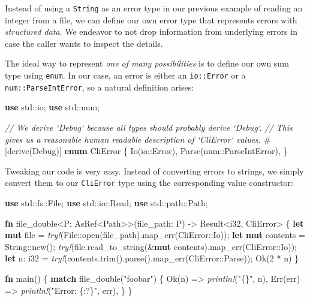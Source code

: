 \documentclass[a4paper,]{book}
\newenvironment{Shaded}{\begin{snugshade}}{\end{snugshade}}
\newcommand{\KeywordTok}[1]{\textcolor[rgb]{0.13,0.29,0.53}{\textbf{{#1}}}}
\newcommand{\DataTypeTok}[1]{\textcolor[rgb]{0.13,0.29,0.53}{{#1}}}
\newcommand{\DecValTok}[1]{\textcolor[rgb]{0.00,0.00,0.81}{{#1}}}
\newcommand{\ConstantTok}[1]{\textcolor[rgb]{0.00,0.00,0.00}{{#1}}}
\newcommand{\StringTok}[1]{\textcolor[rgb]{0.31,0.60,0.02}{{#1}}}
\newcommand{\CommentTok}[1]{\textcolor[rgb]{0.56,0.35,0.01}{\textit{{#1}}}}
\newcommand{\BuiltInTok}[1]{{#1}}
\newcommand{\PreprocessorTok}[1]{\textcolor[rgb]{0.56,0.35,0.01}{\textit{{#1}}}}
\newcommand{\AttributeTok}[1]{\textcolor[rgb]{0.77,0.63,0.00}{{#1}}}
\newcommand{\NormalTok}[1]{{#1}}
\begin{document}
Instead of using a \texttt{String} as an error type in our previous
example of reading an integer from a file, we can define our own error
type that represents errors with \emph{structured data}. We endeavor to
not drop information from underlying errors in case the caller wants to
inspect the details.

The ideal way to represent \emph{one of many possibilities} is to define
our own sum type using \texttt{enum}. In our case, an error is either an
\texttt{io::Error} or a \texttt{num::ParseIntError}, so a natural
definition arises:

\begin{Shaded}
\begin{Highlighting}[]
\KeywordTok{use} \NormalTok{std::io;}
\KeywordTok{use} \NormalTok{std::num;}

\CommentTok{// We derive `Debug` because all types should probably derive `Debug`.}
\CommentTok{// This gives us a reasonable human readable description of `CliError` values.}
\AttributeTok{#[}\NormalTok{derive}\AttributeTok{(}\BuiltInTok{Debug}\AttributeTok{)]}
\KeywordTok{enum} \NormalTok{CliError \{}
    \NormalTok{Io(io::Error),}
    \NormalTok{Parse(num::ParseIntError),}
\NormalTok{\}}
\end{Highlighting}
\end{Shaded}

Tweaking our code is very easy. Instead of converting errors to strings,
we simply convert them to our \texttt{CliError} type using the
corresponding value constructor:

\begin{Shaded}
\begin{Highlighting}[]
\KeywordTok{use} \NormalTok{std::fs::File;}
\KeywordTok{use} \NormalTok{std::io::Read;}
\KeywordTok{use} \NormalTok{std::path::Path;}

\KeywordTok{fn} \NormalTok{file_double<P: AsRef<Path>>(file_path: P) -> }\DataTypeTok{Result}\NormalTok{<}\DataTypeTok{i32}\NormalTok{, CliError> \{}
    \KeywordTok{let} \KeywordTok{mut} \NormalTok{file = }\PreprocessorTok{try!}\NormalTok{(File::open(file_path).map_err(CliError::Io));}
    \KeywordTok{let} \KeywordTok{mut} \NormalTok{contents = }\DataTypeTok{String}\NormalTok{::new();}
    \PreprocessorTok{try!}\NormalTok{(file.read_to_string(&}\KeywordTok{mut} \NormalTok{contents).map_err(CliError::Io));}
    \KeywordTok{let} \NormalTok{n: }\DataTypeTok{i32} \NormalTok{= }\PreprocessorTok{try!}\NormalTok{(contents.trim().parse().map_err(CliError::Parse));}
    \ConstantTok{Ok}\NormalTok{(}\DecValTok{2} \NormalTok{* n)}
\NormalTok{\}}

\KeywordTok{fn} \NormalTok{main() \{}
    \KeywordTok{match} \NormalTok{file_double(}\StringTok{"foobar"}\NormalTok{) \{}
        \ConstantTok{Ok}\NormalTok{(n) => }\PreprocessorTok{println!}\NormalTok{(}\StringTok{"\{\}"}\NormalTok{, n),}
        \ConstantTok{Err}\NormalTok{(err) => }\PreprocessorTok{println!}\NormalTok{(}\StringTok{"Error: \{:?\}"}\NormalTok{, err),}
    \NormalTok{\}}
\NormalTok{\}}
\end{Highlighting}
\end{Shaded}
\end{document}
